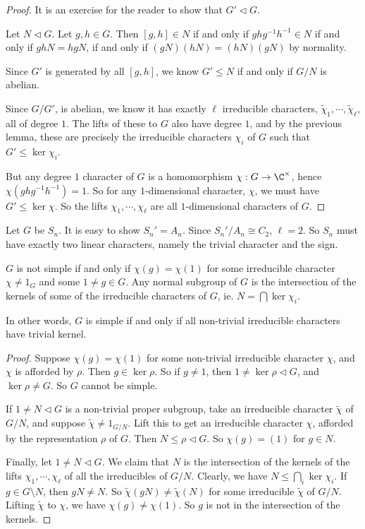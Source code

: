 \documentclass[a4paper]{article}
\begin{document}
\begin{proof}
  It is an exercise for the reader to show that $G' \lhd G$. %

  Let $N \lhd G$. Let $g, h \in G$. Then $[g, h] \in N$ if and only if $ghg^{-1}h^{-1} \in N$ if and only if $gh N = hg N$, if and only if $(gN)(hN) = (hN)(gN)$ by normality.

  Since $G'$ is generated by all $[g, h]$, we know $G' \leq N$ if and only if $G/N$ is abelian.

  Since $G/G'$, is abelian, we know it has exactly $\ell$ irreducible characters, $\tilde{\chi}_1, \cdots, \tilde{\chi}_{\ell}$, all of degree $1$. The lifts of these to $G$ also have degree $1$, and by the previous lemma, these are precisely the irreducible characters $\chi_i$ of $G$ such that $G' \leq \ker \chi_i$.

  But any degree $1$ character of $G$ is a homomorphism $\chi: G \to \C^\times$, hence $\chi(ghg^{-1}h^{-1}) = 1$. So for any $1$-dimensional character, $\chi$, we must have $G' \leq \ker \chi$. So the lifts $\chi_1, \cdots, \chi_\ell$ are all $1$-dimensional characters of $G$.
\end{proof}

\begin{eg}
  Let $G$ be $S_n$. It is easy to show $S_n' = A_n$. Since $S_n'/A_n \cong C_2$, $\ell = 2$. So $S_n$ must have exactly two linear characters, namely the trivial character and the sign.
\end{eg}

\begin{lemma}
  $G$ is not simple if and only if $\chi(g) = \chi(1)$ for some irreducible character $\chi \not= 1_G$ and some $1 \not= g \in G$. Any normal subgroup of $G$ is the intersection of the kernels of some of the irreducible characters of $G$, ie. $N = \bigcap \ker \chi_i$.
\end{lemma}
In other words, $G$ is simple if and only if all non-trivial irreducible characters have trivial kernel.

\begin{proof}
  Suppose $\chi(g) = \chi(1)$ for some non-trivial irreducible character $\chi$, and $\chi$ is afforded by $\rho$. Then $g \in \ker \rho$. So if $g \not= 1$, then $1 \not= \ker \rho \lhd G$, and $\ker \rho \not= G$. So $G$ cannot be simple.

  If $1 \not= N \lhd G$ is a non-trivial proper subgroup, take an irreducible character $\tilde{\chi}$ of $G/N$, and suppose $\tilde{\chi} \not= 1_{G/N}$. Lift this to get an irreducible character $\chi$, afforded by the representation $\rho$ of $G$. Then $N \leq \rho \lhd G$. So $\chi(g) = (1)$ for $g \in N$.

  Finally, let $1 \not= N \lhd G$. We claim that $N$ is the intersection of the kernels of the lifts $\chi_1, \cdots, \chi_\ell$ of all the irreducibles of $G/N$. Clearly, we have $N \leq \bigcap_i \ker \chi_i$. If $g \in G \setminus N$, then $gN \not= N$. So $\tilde{\chi}(gN) \not= \tilde{\chi}(N)$ for some irreducible $\tilde{\chi}$ of $G/N$. Lifting $\tilde{\chi}$ to $\chi$, we have $\chi(g) \not= \chi(1)$. So $g$ is not in the intersection of the kernels. %
\end{proof}
\end{document}
